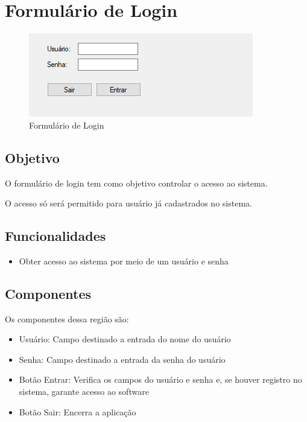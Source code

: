 \documentclass[
	article,			%
	12pt,				%
	oneside,			%
	a4paper,			%
	english,			%
	brazil,				%
	sumario=tradicional
	]{abntex2}
\begin{document}
	\section{Formulário de Login}
	\begin{figure}[!htb]
		\centering
		\includegraphics[scale=1.4]{../Figuras/FrmLogin.png}
		\caption{Formulário de Login}
	\end{figure}
\subsection{Objetivo}
O formulário de login tem como objetivo controlar o acesso ao sistema.

O acesso só será permitido para usuário já cadastrados no sistema.
\subsection{Funcionalidades}
\begin{itemize}
	\item Obter acesso ao sistema por meio de um usuário e senha
\end{itemize}
\subsection{Componentes}
	Os componentes dessa região são:
\begin{itemize}\itemsep1.5pt	
	\item Usuário: Campo destinado a entrada do nome do usuário
	\item Senha: Campo destinado a entrada da senha do usuário	
	\item Botão Entrar: Verifica os campos do usuário e senha e, se houver registro no sistema, garante acesso ao software	
	\item Botão Sair: Encerra a aplicação	
\end{itemize}
\end{document}
